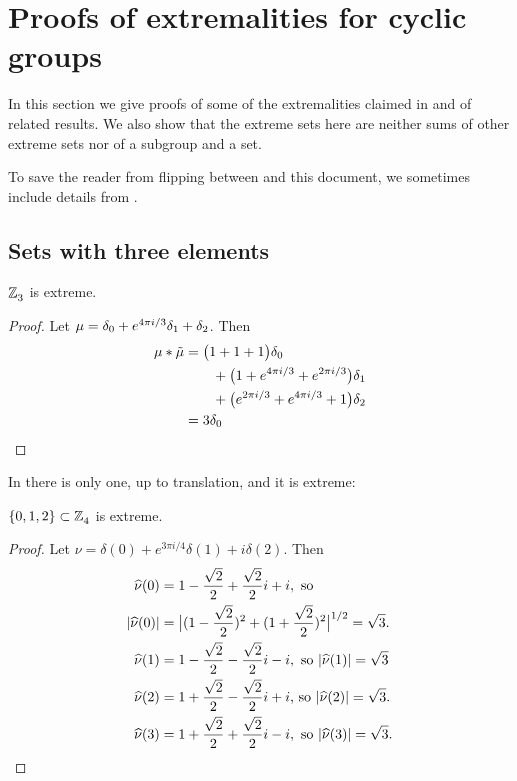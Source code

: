 \section{Proofs of extremalities for cyclic groups}
In this section we give   proofs of some of the extremalities claimed in and of related results.
 We also show that the extreme sets here are neither sums of other extreme sets nor of a subgroup and a set.

To save the reader from flipping between \cite{ABeastiary} and this document, we sometimes include details
from \cite{ABeastiary}.

\subsection{Sets with three elements}

\begin{prop}\label{prop3inZ3}
$\texttt{$\mathbb Z_{3}^{\,}$}$ is extreme. \newline \end{prop} 


 
\begin{proof}
Let  $\mu =  \delta_{0}+e^{4\pi i/3}\delta_{1}+\delta_{2}
$.  Then 
\begin{align*} 
\mu * \tilde \mu & = \big(1+1+1\big)\delta_{0}
\\&\qquad
+\big(1+e^{4\pi i/3}+e^{2\pi i/3}\big)\delta_{1}
\\&\qquad
+\big(e^{2\pi i/3}+e^{4\pi i/3}+1\big)\delta_{2}\\&=3\delta_{0}\qedhere
\end{align*}
\end{proof}



In  there is only one, up to translation, and it is extreme:
\begin{prop}\cite{MR627683}\label{prop3in4}
 $\{0,1,2\}\subset \texttt{$\mathbb Z_{4}^{\,}$}$ is extreme.
\end{prop}
\begin{proof}
Let $\nu = \delta(0) + e^{3\pi i/4}\delta(1) +i\delta(2)$.
Then
\begin{align*}
\widehat\nu(0) &= 1- \frac{\sqrt2}2 + \frac{\sqrt2}2i +i, \text{ so }
\\  
|\widehat\nu(0)| &= \big|(1-\frac{\sqrt2}2)^2 +(1+\frac{\sqrt2}2)^2\big|^{1/2} =\sqrt3.
\\
\widehat\nu(1) &= 1 -\frac{\sqrt2}2 -\frac{\sqrt2}2i -i, \text{ so }
|\widehat\nu(1)|=  \sqrt3\\
\widehat\nu(2) & = 1 +\frac{\sqrt2}2 -\frac{\sqrt2}2i +i \text{, so } |\widehat\nu(2)|= \sqrt3.
\\
\widehat\nu(3) & = 1  +\frac{\sqrt2}2 +\frac{\sqrt2}2i -i, \text{ so } 
|\widehat\nu(3)| = \sqrt3.\qedhere
\end{align*}
\end{proof}

